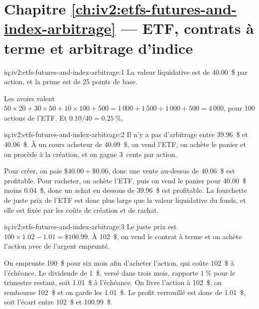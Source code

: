\section*{Chapitre \ref{ch:iv2:etfs-futures-and-index-arbitrage} --- ETF, contrats à terme et arbitrage d'indice}

\begin{solution}{iq:iv2:etfs-futures-and-index-arbitrage:1}
La valeur liquidative est de 40.00~\$ par action, et la prime est de 25 points de base.

Les avoirs valent $50 \times 20 + 30 \times 50 + 10 \times 100 + 500 = 1\,000 + 1\,500 + 1\,000 + 500 = 4\,000$, pour 100 actions de l'ETF. Et $0.10/40 = 0.25~\%$.

\end{solution}

\begin{solution}{iq:iv2:etfs-futures-and-index-arbitrage:2}
Il n'y a pas d'arbitrage entre 39.96~\$ et 40.06~\$. À un cours acheteur de 40.09~\$, on vend l'ETF, on achète le panier et on procède à la création, et on gagne 3~cents par action.

Pour créer, on paie $\$40.00 + \$0.06$, donc une vente au-dessus de 40.06~\$ est profitable. Pour racheter, on achète l'ETF, puis on vend le panier pour 40.00~\$ moins 0.04~\$, donc un achat en dessous de 39.96~\$ est profitable. La fourchette de juste prix de l'ETF est donc plus large que la valeur liquidative du fonds, et elle est fixée par les coûts de création et de rachat.

\end{solution}

\begin{solution}{iq:iv2:etfs-futures-and-index-arbitrage:3}
Le juste prix est $100 \times 1.02 - 1.01 = \$100.99$. À 102~\$, on vend le contrat à terme et on achète l'action avec de l'argent emprunté.

On emprunte 100~\$ pour six mois afin d'acheter l'action, qui coûte 102~\$ à l'échéance. Le dividende de 1~\$, versé dans trois mois, rapporte $1~\% $ pour le trimestre restant, soit 1.01~\$ à l'échéance. On livre l'action à 102~\$, on rembourse 102~\$ et on garde les 1.01~\$. Le profit verrouillé est donc de 1.01~\$, soit l'écart entre 102~\$ et 100.99~\$.

\end{solution}

